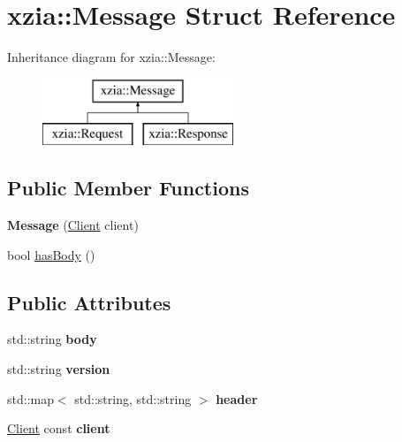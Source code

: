 \hypertarget{structxzia_1_1Message}{}\section{xzia\+:\+:Message Struct Reference}
\label{structxzia_1_1Message}
Inheritance diagram for xzia\+:\+:Message\+:\begin{figure}[H]
\begin{center}
\leavevmode
\includegraphics[height=2.000000cm]{structxzia_1_1Message}
\end{center}
\end{figure}
\subsection*{Public Member Functions}
\begin{DoxyCompactItemize}
\item 
\mbox{\label{structxzia_1_1Message_a8f266edc36c0d6dca420e67547a91547}} 
{\bfseries Message} (\mbox{\hyperlink{structClient}{Client}} client)
\item 
bool \mbox{\hyperlink{structxzia_1_1Message_a096560e32a7b9dd61421770fc0199402}{has\+Body}} ()
\end{DoxyCompactItemize}
\subsection*{Public Attributes}
\begin{DoxyCompactItemize}
\item 
\mbox{\label{structxzia_1_1Message_a39985c243bca49b58e9295655473acf8}} 
std\+::string {\bfseries body}
\item 
\mbox{\label{structxzia_1_1Message_af7dbb8337a84b35014d2389b8ca41073}} 
std\+::string {\bfseries version}
\item 
\mbox{\label{structxzia_1_1Message_a8c20098d713f5546ffb8486d730045d2}} 
std\+::map$<$ std\+::string, std\+::string $>$ {\bfseries header}
\item 
\mbox{\label{structxzia_1_1Message_a6af0c43aad93c5f4e7f252c813c9fb27}} 
\mbox{\hyperlink{structClient}{Client}} const {\bfseries client}
\end{DoxyCompactItemize}


